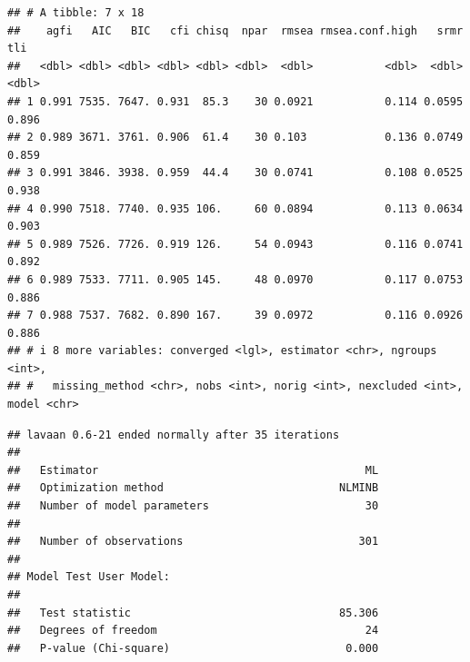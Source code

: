 \documentclass[
  english,
  man]{apa7}
\newenvironment{Shaded}{\begin{snugshade}}{\end{snugshade}}
\newcommand{\CommentTok}[1]{\textcolor[rgb]{0.56,0.35,0.01}{\textit{#1}}}
\newcommand{\NormalTok}[1]{#1}
\newcommand{\SpecialCharTok}[1]{\textcolor[rgb]{0.81,0.36,0.00}{\textbf{#1}}}
\begin{document}
\begin{verbatim}
## # A tibble: 7 x 18
##    agfi   AIC   BIC   cfi chisq  npar  rmsea rmsea.conf.high   srmr   tli
##   <dbl> <dbl> <dbl> <dbl> <dbl> <dbl>  <dbl>           <dbl>  <dbl> <dbl>
## 1 0.991 7535. 7647. 0.931  85.3    30 0.0921           0.114 0.0595 0.896
## 2 0.989 3671. 3761. 0.906  61.4    30 0.103            0.136 0.0749 0.859
## 3 0.991 3846. 3938. 0.959  44.4    30 0.0741           0.108 0.0525 0.938
## 4 0.990 7518. 7740. 0.935 106.     60 0.0894           0.113 0.0634 0.903
## 5 0.989 7526. 7726. 0.919 126.     54 0.0943           0.116 0.0741 0.892
## 6 0.989 7533. 7711. 0.905 145.     48 0.0970           0.117 0.0753 0.886
## 7 0.988 7537. 7682. 0.890 167.     39 0.0972           0.116 0.0926 0.886
## # i 8 more variables: converged <lgl>, estimator <chr>, ngroups <int>,
## #   missing_method <chr>, nobs <int>, norig <int>, nexcluded <int>, model <chr>
\end{verbatim}

\begin{Shaded}
\end{Shaded}

\begin{verbatim}
## lavaan 0.6-21 ended normally after 35 iterations
## 
##   Estimator                                         ML
##   Optimization method                           NLMINB
##   Number of model parameters                        30
## 
##   Number of observations                           301
## 
## Model Test User Model:
##                                                       
##   Test statistic                                85.306
##   Degrees of freedom                                24
##   P-value (Chi-square)                           0.000
\end{verbatim}

\begin{Shaded}
\end{Shaded}
\end{document}

